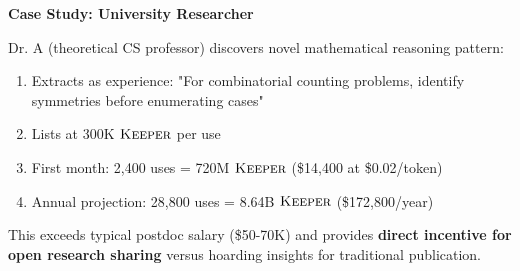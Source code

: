 \textbf{Case Study: University Researcher}

Dr. A (theoretical CS professor) discovers novel mathematical reasoning pattern:
\begin{enumerate}
\item Extracts as experience: "For combinatorial counting problems, identify symmetries before enumerating cases"
\item Lists at 300K $\textsc{Keeper}$ per use
\item First month: 2,400 uses = 720M $\textsc{Keeper}$ (\$14,400 at \$0.02/token)
\item Annual projection: 28,800 uses = 8.64B $\textsc{Keeper}$ (\$172,800/year)
\end{enumerate}

This exceeds typical postdoc salary (\$50-70K) and provides \textbf{direct incentive for open research sharing} versus hoarding insights for traditional publication.

